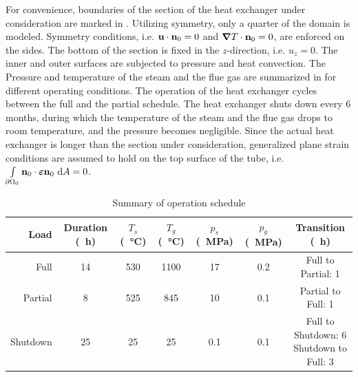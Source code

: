 For convenience, boundaries of the section of the heat exchanger under consideration are marked in . Utilizing symmetry, only a quarter of the domain is modeled. Symmetry conditions, i.e. $\textbf{u} \cdot \textbf{n}_0 = 0$ and $\boldsymbol{\nabla} T \cdot \textbf{n}_0 = 0$, are enforced on the sides. The bottom of the section is fixed in the $z$-direction, i.e. $u_z = 0$. The inner and outer surfaces are subjected to pressure and heat convection.
The Pressure and temperature of the steam and the flue gas are summarized in  for different operating conditions. The operation of the heat exchanger cycles between the full and the partial schedule. The heat exchanger shuts down every 6 months, during which the temperature of the steam and the flue gas drops to room temperature, and the pressure becomes negligible. Since the actual heat exchanger is longer than the section under consideration, generalized plane strain conditions are assumed to hold on the top surface of the tube, i.e. $\int\limits_{{\partial \Omega}_0} \textbf{n}_0 \cdot \boldsymbol{\varepsilon} \textbf{n}_0 \text{ d}A = 0 $.



\begin{table}[!htb]
  \small
  \centering
  \caption{Summary of operation schedule}
  \label{table: Chapter5/spallation/schedule}
  \begin{tabular}{r c c c c c c}
    \toprule
    Load     & Duration (\SI{}{\hour}) & $T_s$ (\SI{}{\celsius}) & $T_g$ (\SI{}{\celsius}) & $p_s$ (\SI{}{\mega\pascal}) & $p_g$ (\SI{}{\mega\pascal}) & Transition (\SI{}{\hour})        \\
    \midrule
    Full     & 14                      & 530                     & 1100                    & 17                          & 0.2                         & Full to Partial: 1               \\
    Partial  & 8                       & 525                     & 845                     & 10                          & 0.1                         & Partial to Full: 1               \\
    Shutdown & 25                      & 25                      & 25                      & 0.1                         & 0.1                         & \makecell[t]{Full to Shutdown: 6 \\ Shutdown to Full: 3}       \\
    \bottomrule
  \end{tabular}
\end{table}


